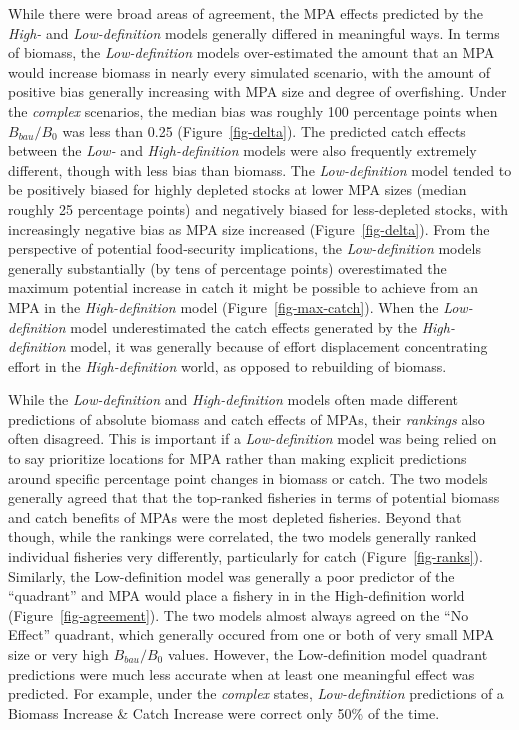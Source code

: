 \documentclass[
  default,
  lineno,
  referee]{sn-jnl}
\begin{document}
While there were broad areas of agreement, the MPA effects predicted by
the \emph{High-} and \emph{Low-definition} models generally differed in
meaningful ways. In terms of biomass, the \emph{Low-definition} models
over-estimated the amount that an MPA would increase biomass in nearly
every simulated scenario, with the amount of positive bias generally
increasing with MPA size and degree of overfishing. Under the
\emph{complex} scenarios, the median bias was roughly 100 percentage
points when \(B_{bau}/B_0\) was less than 0.25 (Figure~\ref{fig-delta}).
The predicted catch effects between the \emph{Low-} and
\emph{High-definition} models were also frequently extremely different,
though with less bias than biomass. The \emph{Low-definition} model
tended to be positively biased for highly depleted stocks at lower MPA
sizes (median roughly 25 percentage points) and negatively biased for
less-depleted stocks, with increasingly negative bias as MPA size
increased (Figure~\ref{fig-delta}). From the perspective of potential
food-security implications, the \emph{Low-definition} models generally
substantially (by tens of percentage points) overestimated the maximum
potential increase in catch it might be possible to achieve from an MPA
in the \emph{High-definition} model (Figure~\ref{fig-max-catch}). When
the \emph{Low-definition} model underestimated the catch effects
generated by the \emph{High-definition} model, it was generally because
of effort displacement concentrating effort in the
\emph{High-definition} world, as opposed to rebuilding of biomass.

While the \emph{Low-definition} and \emph{High-definition} models often
made different predictions of absolute biomass and catch effects of
MPAs, their \emph{rankings} also often disagreed. This is important if a
\emph{Low-definition} model was being relied on to say prioritize
locations for MPA rather than making explicit predictions around
specific percentage point changes in biomass or catch. The two models
generally agreed that that the top-ranked fisheries in terms of
potential biomass and catch benefits of MPAs were the most depleted
fisheries. Beyond that though, while the rankings were correlated, the
two models generally ranked individual fisheries very differently,
particularly for catch (Figure~\ref{fig-ranks}). Similarly, the
Low-definition model was generally a poor predictor of the ``quadrant''
and MPA would place a fishery in in the High-definition world
(Figure~\ref{fig-agreement}). The two models almost always agreed on the
``No Effect'' quadrant, which generally occured from one or both of very
small MPA size or very high \(B_{bau}/B_0\) values. However, the
Low-definition model quadrant predictions were much less accurate when
at least one meaningful effect was predicted. For example, under the
\emph{complex} states, \emph{Low-definition} predictions of a Biomass
Increase \& Catch Increase were correct only 50\% of the time.
\end{document}
